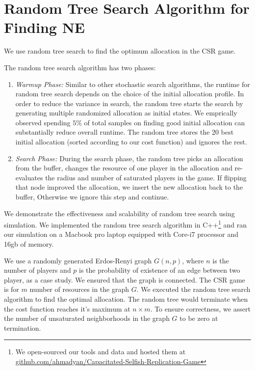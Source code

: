 \section{Random Tree Search Algorithm for Finding NE}\label{sec:apx-alg}
We use random tree search to find the optimum allocation in the CSR game.






The random tree search algorithm has two phases:
\begin{enumerate}
  \item \emph{Warmup Phase:} Similar to other stochastic search algorithms, the runtime for random tree search depends on the choice of the initial allocation profile. In order to reduce the variance in search, the random tree starts the search by generating multiple randomized allocation as initial states. We emprically observed spending $5\%$ of total samples on finding good initial allocation can substantially reduce overall runtime. The random tree stores the 20 best initial allocation (sorted according to our cost function) and ignores the rest.
  \item \emph{Search Phase:} During the search phase, the random tree picks an allocation from the buffer, changes the resource of one player in the allocation and re-evaluates the radius and number of saturated players in the game. If flipping that node improved the allocation, we insert the new allocation back to the buffer, Otherwise we ignore this step and continue.
\end{enumerate}



We demonstrate the effectiveness and scalability of random tree search using simulation.
We implemented the random tree search algorithm in C++\footnote{We open-sourced our tools and data and hosted them at \url{github.com/ahmadyan/Capacitated-Selfish-Replication-Game}} and ran our simulation on a Macbook pro laptop equipped with Core-i7 processor and 16gb of memory.

We use a randomly generated Erdos-Renyi graph $G(n,p)$, where $n$ is the number of players and $p$ is the probability of existence of an edge between two player, as a case study. We ensured that the graph is connected. The CSR game is for $m$ number of resources in the graph $G$. We executed the random tree search algorithm to find the optimal allocation. The random tree would terminate when the cost function reaches it's maximum at $n\times m$. To ensure correctness, we assert the number of unsaturated neighborhoods in the graph $G$ to be zero at termination.

